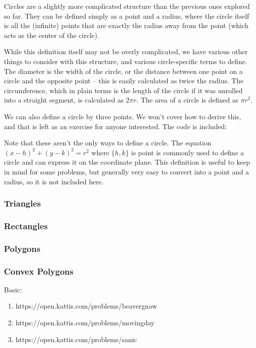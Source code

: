 Circles are a slightly more complicated structure than the previous ones explored so far. They can be defined simply as a point and a radius, where the circle itself is all the (infinite) points that are exactly the radius away from the point (which acts as the center of the circle).

While this definition itself may not be overly complicated, we have various other things to consider with this structure, and various circle-specific terms to define. The diameter is the width of the circle, or the distance between one point on a circle and the opposite point -- this is easily calculated as twice the radius. The circumference, which in plain terms is the length of the circle if it was unrolled into a straight segment, is calculated as $2 \pi r$. The area of a circle is defined as $\pi r^2$.

We can also define a circle by three points. We won't cover how to derive this, and that is left as an exercise for anyone interested. The code is included:


Note that these aren't the only ways to define a circle. The equation $(x-h)^2 + (y-k)^2 = r^2$ where $\{h,k\}$ is point is commonly used to define a circle and can express it on the coordinate plane. This definition is useful to keep in mind for some problems, but generally very easy to convert into a point and a radius, so it is not included here.

\subsubsection{Triangles}

\subsubsection{Rectangles}

\subsubsection{Polygons}

\subsubsection{Convex Polygons}

\hrulefill

Basic:
\begin{enumerate}
\item https://open.kattis.com/problems/beavergnaw
\item https://open.kattis.com/problems/movingday
\item https://open.kattis.com/problems/sanic
\end{enumerate}
